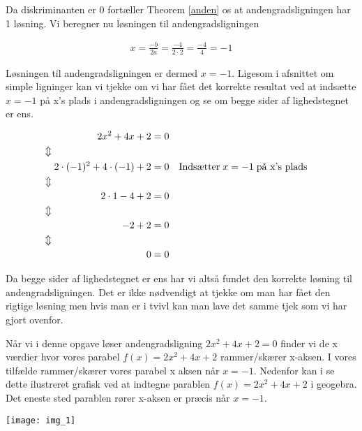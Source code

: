 Da diskriminanten er 0 fortæller Theorem \ref{anden} os at andengradsligningen har 1 løsning. Vi beregner nu løsningen til andengradsligningen

\begin{align*}
x = \frac{-b}{2a} = \frac{-4}{2\cdot 2} = \frac{-4}{4} = -1
\end{align*}

Løsningen til andengradsligningen er dermed $x = -1$. Ligesom i afsnittet om simple ligninger kan vi tjekke om vi har fået det korrekte resultat ved at indsætte $x=-1$ på x's plads i andengradsligningen og se om begge sider af lighedstegnet er ens.

\begin{align*}
2x^2 +4x + 2 &= 0\\
\Updownarrow \hspace*{36mm} &\\
2\cdot (-1)^2 + 4\cdot (-1) + 2 &= 0 && \text{Indsætter} \hspace{1mm} x=-1 \hspace*{1mm} \text{på x's plads}\\
\Updownarrow \hspace*{36mm} &\\
2\cdot 1 -4 + 2 &= 0\\
\Updownarrow \hspace*{36mm} &\\
-2 + 2 &= 0\\
\Updownarrow \hspace*{36mm} &\\
0 &= 0
\end{align*}

Da begge sider af lighedstegnet er ens har vi altså fundet den korrekte løsning til andengradsligningen. Det er ikke nødvendigt at tjekke om man har fået den rigtige løsning men hvis man er i tvivl kan man lave det samme tjek som vi har gjort ovenfor.

Når vi i denne opgave løser andengradsligning  $2x^2 +4x + 2 = 0$ finder vi de x værdier hvor vores parabel $f(x) = 2x^2 +4x + 2$ rammer/skærer x-aksen. I vores tilfælde rammer/skærer vores parabel x aksen når $x = -1$. Nedenfor kan i se dette ilustreret grafisk ved at indtegne parablen $f(x) = 2x^2 + 4x + 2$ i geogebra. Det eneste sted parablen rører x-aksen er præcis når $x=-1$.

\texttt{[image: img\_1]}